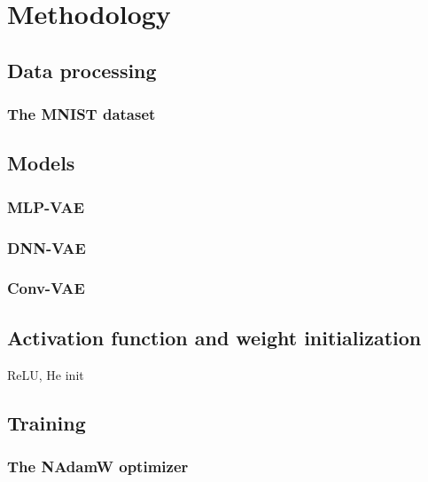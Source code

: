 \section{Methodology}\label{sec:Method}

\subsection{Data processing}
\subsubsection{The MNIST dataset}

\subsection{Models}
\subsubsection{MLP-VAE}

\subsubsection{DNN-VAE}

\subsubsection{Conv-VAE}

\subsection{Activation function and weight initialization}

ReLU, He init

\subsection{Training}

\subsubsection{The NAdamW optimizer}


